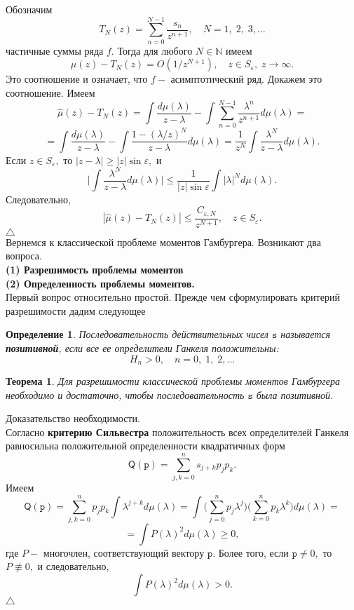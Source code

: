 \documentclass[12 pt, a4 paper]{article}
\theoremstyle{plain}   \newtheorem{Pro}{Задача}
\newtheorem{Def}{Определение}
\newtheorem{The}{Теорема}
\begin{document}
Обозначим
$$
  T_N (z)=\sum _{n=0}^{N-1}
  \frac{s_n}{z^{n+1}},
  \quad N=1, \; 2, \; 3,...
$$
частичные суммы ряда
$ f . $
Тогда для любого
$ N \in \mathbb{N} $
имеем
$$
  \hat \mu (z)-T_N (z)=O(1/z^{N+1}),
  \quad z \in S_{\varepsilon}, \; z \rightarrow \infty .
$$
Это соотношение и означает, что
$ f - $
асимптотический ряд. Докажем это соотношение. Имеем
$$
  \hat \mu (z)-T_N (z)=
  \int \frac{d \mu ( \lambda )}{z-\lambda}-
  \int \sum _{n=0}^{N-1} \frac{\lambda ^n}{z^{n+1}}
  d \mu ( \lambda )=
$$
$$
  =\int \frac{d \mu ( \lambda )}{z-\lambda}-
  \int \frac{1-(\lambda /z)^N}{z-\lambda}d \mu (\lambda )=
  \frac{1}{z^N} \int \frac{\lambda ^N}{z-\lambda}d \mu ( \lambda ).
$$
Если
$ z \in S_{\varepsilon} , $
то
$ |z-\lambda | \geq |z| \sin \varepsilon , $
и
$$
  \biggl | \int \frac{\lambda ^N}{z-\lambda}d \mu (\lambda ) \biggr | \leq
  \frac{1}{|z| \sin \varepsilon } \int | \lambda |^N
  d \mu ( \lambda ).
$$
Следовательно,
$$
  | \hat \mu (z)-T_N (z)| \leq
  \frac{C_{\varepsilon , N}}{z^{N+1}},
  \quad z \in S_{\varepsilon}.
$$
$ \triangle $
\\

Вернемся к классической проблеме моментов Гамбургера.
Возникают два вопроса.
\\
{\bfseries (1) Разрешимость проблемы моментов}
\\
{\bfseries (2) Определенность проблемы моментов.}
\\
Первый вопрос относительно простой. Прежде чем
сформулировать критерий разрешимости дадим следующее
\begin{Def}
Последовательность действительных чисел
$ \mathtt{s} $
называется
{\bfseries позитивной},
если все ее определители Ганкеля положительны:
$$
  H_n >0, \quad n=0, \; 1, \; 2,...
$$
\end{Def}
\begin{The}
Для разрешимости классической проблемы моментов Гамбургера
необходимо и достаточно, чтобы последовательность
$ \mathtt{s} $
была позитивной.
\end{The}							
{\Large Доказательство}
необходимости.\\
Согласно
{\bfseries критерию Сильвестра}
положительность всех
определителей Ганкеля равносильна положительной определенности
квадратичных форм
$$
  \mathsf{Q} ( \mathtt{p} )=
  \sum _{j,k=0}^n s_{j+k}p_j p_k .
$$
Имеем
$$
  \mathsf{Q} (\mathtt{p})=
  \sum _{j,k=0}^{n}p_j p_k \int \lambda ^{j+k} d \mu (\lambda )=
  \int \biggl ( \sum _{j=0}^{n} p_j \lambda ^j \biggr )
  \biggl ( \sum _{k=0}^{n} p_k \lambda ^k \biggr )
  d \mu (\lambda )=
$$
$$
  =\int P( \lambda )^2 d \mu (\lambda ) \geq 0,
$$
где
$ P - $
многочлен, соответствующий вектору
$ \mathtt{p} . $
Более того, если
$ \mathtt{p} \not = 0, $
то
$ P \not \equiv 0 , $
и следовательно,
$$
  \int P(\lambda )^2 d \mu ( \lambda ) >0.
$$
$ \triangle $
\newpage
\end{document}
